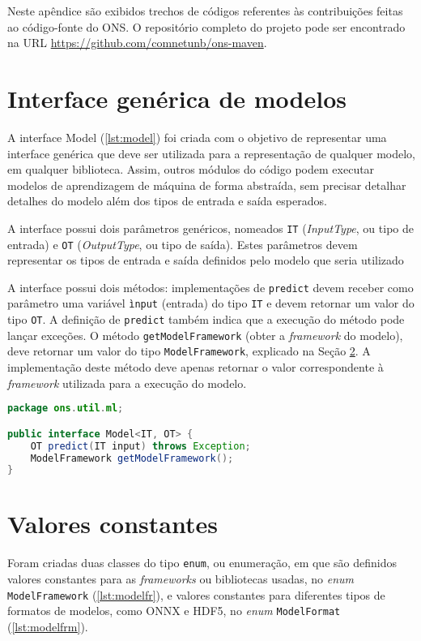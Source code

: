 Neste apêndice são exibidos trechos de códigos referentes às contribuições feitas ao código-fonte do \acrfull{ONS}. O repositório completo do projeto pode ser encontrado na URL \url{https://github.com/comnetunb/ons-maven}.

\section{Interface genérica de modelos}
\label{appendix-ons-model}

A interface Model (\ref{lst:model}) foi criada com o objetivo de representar uma interface genérica que deve ser utilizada para a representação de qualquer modelo, em qualquer biblioteca. Assim, outros módulos do código podem executar modelos de aprendizagem de máquina de forma abstraída, sem precisar detalhar detalhes do modelo além dos tipos de entrada e saída esperados.

A interface possui dois parâmetros genéricos, nomeados \texttt{IT} (\textit{InputType}, ou tipo de entrada) e \texttt{OT} (\textit{OutputType}, ou tipo de saída). Estes parâmetros devem representar os tipos de entrada e saída definidos pelo modelo que seria utilizado

A interface possui dois métodos: implementações de \texttt{predict} devem receber como parâmetro uma variável \texttt{ìnput} (entrada) do tipo \texttt{IT} e devem retornar um valor do tipo \texttt{OT}. A definição de \texttt{predict} também indica que a execução do método pode lançar exceções. O método \texttt{getModelFramework} (obter a \textit{framework} do modelo), deve retornar um valor do tipo \texttt{ModelFramework}, explicado na Seção \ref{appendix-ons-enums}. A implementação deste método deve apenas retornar o valor correspondente à \textit{framework} utilizada para a execução do modelo.

\begin{lstlisting}[language=Java, caption=Implementação da interface Model, label={lst:model}]
package ons.util.ml;

public interface Model<IT, OT> {
    OT predict(IT input) throws Exception;
    ModelFramework getModelFramework();
}
\end{lstlisting}

\section{Valores constantes}
\label{appendix-ons-enums}

Foram criadas duas classes do tipo \texttt{enum}, ou enumeração, em que são definidos valores constantes para as \textit{frameworks} ou bibliotecas usadas, no \textit{enum} \texttt{ModelFramework} (\ref{lst:modelfr}), e valores constantes para diferentes tipos de formatos de modelos, como ONNX e HDF5, no \textit{enum} \texttt{ModelFormat} (\ref{lst:modelfrm}).

